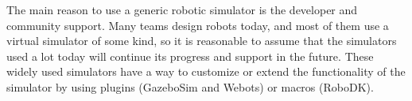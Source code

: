 \documentclass[
  digital, %
  table,   %
  oneside, %
  nolof,     %
  nolot,     %
]{fithesis3}
\begin{document}
The main reason to use a generic robotic simulator is the developer and community support.
Many teams design robots today, and most of them use a virtual simulator of some kind, so it is reasonable to assume that the simulators used a lot today will continue its progress and support in the future.
These widely used simulators have a way to customize or extend the functionality of the simulator by using plugins (GazeboSim\cite{gazebo} and Webots\cite{webots}) or macros (RoboDK\cite{robodk}).
\end{document}
